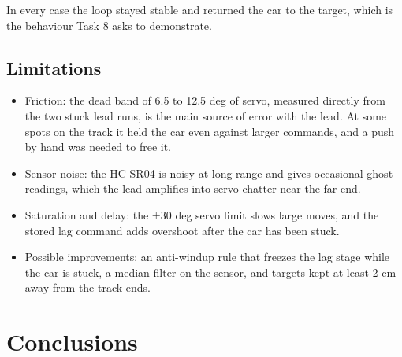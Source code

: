 \documentclass[11pt,a4paper]{article}
\providecommand{\tightlist}{\setlength{\itemsep}{0pt}\setlength{\parskip}{0pt}}
\begin{document}
In every case the loop stayed stable and returned the car to the target,
which is the behaviour Task 8 asks to demonstrate.

\hypertarget{limitations}{%
\subsection{Limitations}\label{limitations}}

\begin{itemize}
\tightlist
\item
  Friction: the dead band of 6.5 to 12.5 deg of servo, measured directly from the two stuck lead runs, is the main
  source of error with the lead. At some spots on the track it held the
  car even against larger commands, and a push by hand was needed to
  free it.
\item
  Sensor noise: the HC-SR04 is noisy at long range and gives occasional
  ghost readings, which the lead amplifies into servo chatter near the
  far end.
\item
  Saturation and delay: the ±30 deg servo limit slows large moves, and
  the stored lag command adds overshoot after the car has been stuck.
\item
  Possible improvements: an anti-windup rule that freezes the lag stage
  while the car is stuck, a median filter on the sensor, and targets
  kept at least 2 cm away from the track ends.
\end{itemize}

\hypertarget{conclusions}{%
\section{Conclusions}\label{conclusions}}
\end{document}
